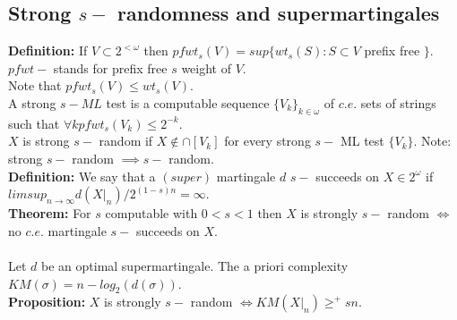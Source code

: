 \documentclass{article}
\begin{document}
  \subsection{Strong $s-$ randomness and supermartingales}
  \textbf{Definition:} If $V \subset 2^{<\omega}$ then $ pfwt_s(V) = sup \{wt_s(S) : S \subset V $ prefix free $\}$. $pfwt-$ stands for prefix free $s$ weight of $V$.\\
  Note that $pfwt_s(V) \leq wt_s(V)$.
  \\ A strong $s-ML$ test is a computable sequence $\{V_k\}_{k \in \omega}$ of $c.e.$ sets of strings such that $\forall k pfwt_s(V_k) \leq 2^{-k}$. \\
  $X$ is strong $s-$ random if $X \not \in \cap [V_k]$ for every strong $s-$ ML test $\{V_k\}$.
  Note: strong $s-$ random $\implies  s-$ random.\\
  \textbf{Definition:} We say that a $(super)$ martingale $d$ $s-$ succeeds on $X \in 2^\omega$ if $limsup_{n \to \infty} d(X|_n)/2^{(1-s)n} = \infty$.\\
  \textbf{Theorem:} For $s$ computable with $0 < s < 1$ then $X$ is strongly $s-$ random $\iff $ no $c.e.$ martingale $s-$ succeeds  on $X$.\\\\
  Let $d$ be an optimal supermartingale. The a priori complexity $KM(\sigma) = n - log_2(d(\sigma))$.\\
  \textbf{Proposition:} $X$ is strongly $s-$ random $\iff KM(X|_n) \geq^+ sn$.
  \newpage
\end{document}

